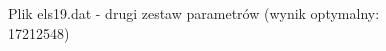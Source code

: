 \documentclass[12pt]{article}
\begin{document}
\begin{figure}
\caption[Podpis_do_spisu]{Plik els19.dat - drugi zestaw parametrów (wynik optymalny: 17212548)}
\end{figure}
\end{document}
